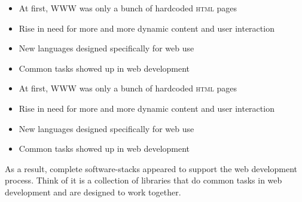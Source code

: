 \documentclass{beamer}
\begin{document}
\begin{frame}
\begin{itemize}[<+->]
  \item At first, WWW was only a bunch of hardcoded \textsc{html} pages
  \item Rise in need for more and more dynamic content and user interaction
  \item New languages designed specifically for web use
  \item Common tasks showed up in web development 
\end{itemize}
\end{frame}

\begin{frame}
\begin{itemize}
  \item At first, WWW was only a bunch of hardcoded \textsc{html} pages
  \item Rise in need for more and more dynamic content and user interaction
  \item New languages designed specifically for web use
  \item Common tasks showed up in web development 
\end{itemize}
As a result, complete software-stacks appeared to support the web development process. Think of it is a collection of libraries that do common tasks in web development and are designed to work together.
\end{frame}

\begin{frame}
\
\end{frame}
\end{document}
